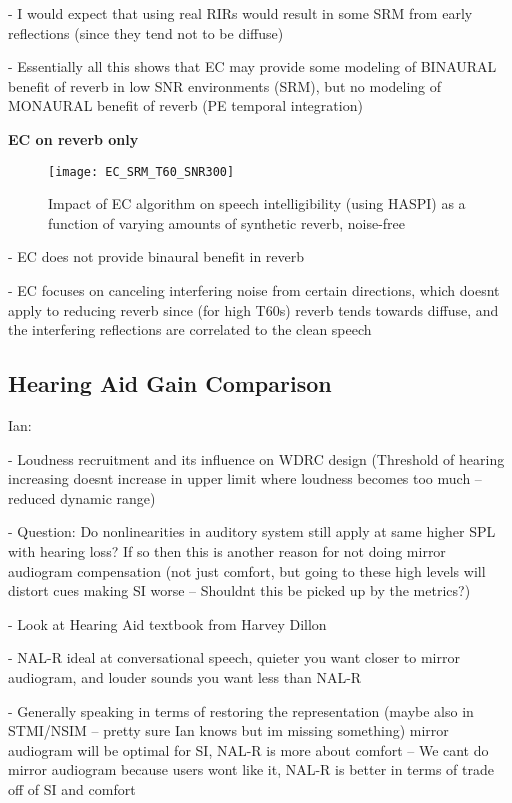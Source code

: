 - I would expect that using real RIRs would result in some SRM from early reflections (since they tend not to be diffuse)

- Essentially all this shows that EC may provide some modeling of BINAURAL benefit of reverb in low SNR environments (SRM), but no modeling of MONAURAL benefit of reverb (PE temporal integration)


\textbf{EC on reverb only}

\begin{figure}[H]
	\texttt{[image: EC\_SRM\_T60\_SNR300]}
	\centering
	\caption{Impact of EC algorithm on speech intelligibility (using HASPI) as a function of varying amounts of synthetic reverb, noise-free}
	\label{fig:EC_SRM_T60_SNR300}
\end{figure}

- EC does not provide binaural benefit in reverb

- EC focuses on canceling interfering noise from certain directions, which doesnt apply to reducing reverb since (for high T60s) reverb tends towards diffuse, and the interfering reflections are correlated to the clean speech



\subsection{Hearing Aid Gain Comparison}

Ian:

- Loudness recruitment and its influence on WDRC design (Threshold of hearing increasing doesnt increase in upper limit where loudness becomes too much -- reduced dynamic range)

- Question: Do nonlinearities in auditory system still apply at same higher SPL with hearing loss? If so then this is another reason for not doing mirror audiogram compensation (not just comfort, but going to these high levels will distort cues making SI worse -- Shouldnt this be picked up by the metrics?)

- Look at Hearing Aid textbook from Harvey Dillon

- NAL-R ideal at conversational speech, quieter you want closer to mirror audiogram, and louder sounds you want less than NAL-R

- Generally speaking in terms of restoring the representation (maybe also in STMI/NSIM -- pretty sure Ian knows but im missing something) mirror audiogram will be optimal for SI, NAL-R is more about comfort -- We cant do mirror audiogram because users wont like it, NAL-R is better in terms of trade off of SI and comfort

